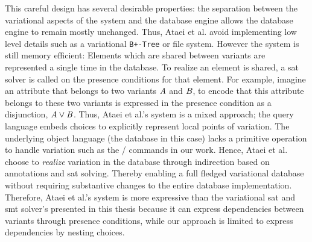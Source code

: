 This careful design has several desirable properties: the separation between the
variational aspects of the system and the database engine allows the database
engine to remain mostly unchanged. Thus, Ataei et al. avoid implementing low
level details such as a variational \texttt{B+-Tree} or file system. However the
system is still memory efficient: Elements which are shared between variants are
represented a single time in the database. To realize an element is shared, a
\ac{sat} solver is called on the presence conditions for that element. For
example, imagine an attribute that belongs to two variants $\mathit{A}$ and
$\mathit{B}$, to encode that this attribute belongs to these two variants is
expressed in the presence condition as a disjunction, $\mathit{A \vee B}$. Thus,
Ataei et al.'s system is a mixed approach; the query language embeds choices to
explicitly represent local points of variation. The underlying object language
(the database in this case) lacks a primitive operation to handle variation such
as the / commands in our work. Hence, Ataei et al. choose to
\emph{realize} variation in the database through indirection based on
annotations and \ac{sat} solving. Thereby enabling a full fledged variational
database without requiring substantive changes to the entire database
implementation. Therefore, Ataei et al.'s system is more expressive than the
variational \ac{sat} and \ac{smt} solver's presented in this thesis because it
can express dependencies between variants through presence conditions, while our
approach is limited to express dependencies by nesting choices.



